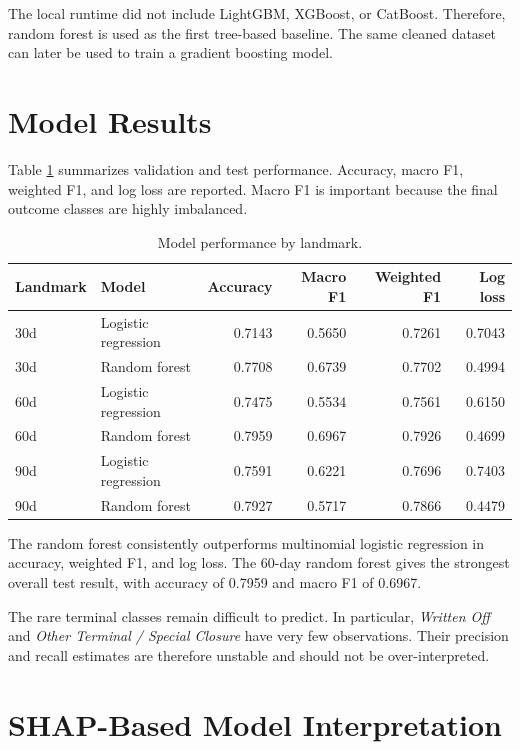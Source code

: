 \documentclass[11pt]{article}
\begin{document}
The local runtime did not include LightGBM, XGBoost, or CatBoost. Therefore, random forest is used as the first tree-based baseline. The same cleaned dataset can later be used to train a gradient boosting model.

\section{Model Results}

Table \ref{tab:model-results} summarizes validation and test performance. Accuracy, macro F1, weighted F1, and log loss are reported. Macro F1 is important because the final outcome classes are highly imbalanced.

\begin{table}[h]
\centering
\caption{Model performance by landmark.}
\label{tab:model-results}
\begin{tabular}{llrrrr}
\toprule
Landmark & Model & Accuracy & Macro F1 & Weighted F1 & Log loss \\
\midrule
30d & Logistic regression & 0.7143 & 0.5650 & 0.7261 & 0.7043 \\
30d & Random forest & 0.7708 & 0.6739 & 0.7702 & 0.4994 \\
60d & Logistic regression & 0.7475 & 0.5534 & 0.7561 & 0.6150 \\
60d & Random forest & 0.7959 & 0.6967 & 0.7926 & 0.4699 \\
90d & Logistic regression & 0.7591 & 0.6221 & 0.7696 & 0.7403 \\
90d & Random forest & 0.7927 & 0.5717 & 0.7866 & 0.4479 \\
\bottomrule
\end{tabular}
\end{table}

The random forest consistently outperforms multinomial logistic regression in accuracy, weighted F1, and log loss. The 60-day random forest gives the strongest overall test result, with accuracy of 0.7959 and macro F1 of 0.6967.

The rare terminal classes remain difficult to predict. In particular, \textit{Written Off} and \textit{Other Terminal / Special Closure} have very few observations. Their precision and recall estimates are therefore unstable and should not be over-interpreted.

\section{SHAP-Based Model Interpretation}
\end{document}
